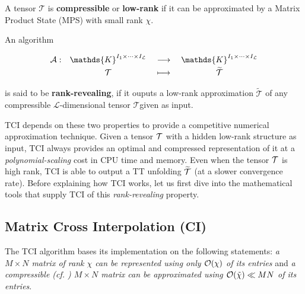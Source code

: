 \begin{definition}
	A tensor $\mathcal{T}$ is {\normalfont \textbf{compressible}} or {\normalfont \textbf{low-rank}} if it can be approximated by a Matrix Product State (MPS) with small rank $\chi$.
	\label{def:compresstensor}
\end{definition}

\begin{definition}
	An algorithm 
	
	\[
		\renewcommand{\arraystretch}{1.1}%
		\begin{array}{r c >{{}}c<{{}} c} 
		\mathcal{A}: &
		\mathds{K}^{I_1 \times \dots \times I_\mathcal{L}} &
		\longrightarrow &
		\mathds{K}^{I_1 \times \dots \times I_\mathcal{L}} \\[2pt]
		& \mathcal{T} &
		\longmapsto &
		\widetilde{\mathcal{T}}
		\end{array}
	\]

	is said to be {\normalfont \textbf{rank-revealing}}, if it ouputs a low-rank approximation $\widetilde{\mathcal{T}}$ of any compressible $\mathcal{L}$-dimensional tensor $\mathcal{T}$\footnotemark given as input.
	\label{def:rkralg}
\end{definition}

TCI depends on these two properties to provide a competitive numerical approximation technique. Given a tensor $\mathcal{T}$ with a hidden low-rank structure as input, TCI always provides an optimal and compressed representation of it at a \textit{polynomial-scaling} cost in CPU time and memory. Even when the tensor $\mathcal{T}$ is high rank, TCI is able to output a TT unfolding $\widetilde{\mathcal{T}}$ (at a slower convergence rate). Before explaining how TCI works, let us first dive into the mathematical tools that supply TCI of this \textit{rank-revealing} property.


\subsection{Matrix Cross Interpolation (CI)}
The TCI algorithm bases its implementation on the following statements: \textit{a $M\times N$ matrix of rank $\chi$ can be represented using only $\mathcal{O}(\chi)$ of its entries} and \textit{a compressible (cf. ) $M\times N$ matrix can be approximated using  $\mathcal{O}({\tilde \chi}) \ll MN$ of its entries}.

